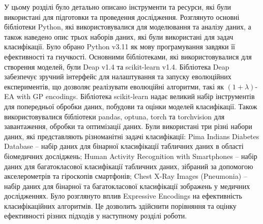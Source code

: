 У цьому розділі було детально описано інструменти та ресурси, які були використані для підготовки та проведення дослідження. Розглянуто основні бібліотеки Python, які використовувалися для моделювання та аналізу даних, а також наведено опис трьох наборів даних, які були використані для задач класифікації. Було обрано Python v3.11 як мову програмування завдяки її ефективності та гнучкості. Основними бібліотеками, які використовувалися для створення моделей, були Deap v1.4 та scikit-learn v1.4. Бібліотека Deap забезпечує зручний інтерфейс для налаштування та запуску еволюційних експериментів, що дозволяє реалізувати еволюційні алгоритми, такі як $(1+\lambda)$-EA with GP encodings. Бібліотека scikit-learn надає великий набір інструментів для попередньої обробки даних, побудови та оцінки моделей класифікації. Також використовувалися бібліотеки pandas, optuna, torch та torchvision для завантаження, обробки та оптимізації даних. Були використані три різні набори даних, які представляють різноманітні задачі класифікації: Pima Indians Diabetes Database -- набір даних для бінарної класифікації табличних даних в області біомедичних досліджень; Human Activity Recognition with Smartphones -- набір даних для багатокласової класифікації табличних даних, зібраний за допомогою акселерометрів та гіроскопів смартфонів; Chest X-Ray Images (Pneumonia) -- набір даних для бінарної та багатокласової класифікації зображень у медичних дослідженнях. Було розглянуто вплив Expressive Encodings на ефективність класифікаційних алгоритмів. Це дозволить здійснити порівняння та оцінку ефективності різних підходів у наступному розділі роботи.